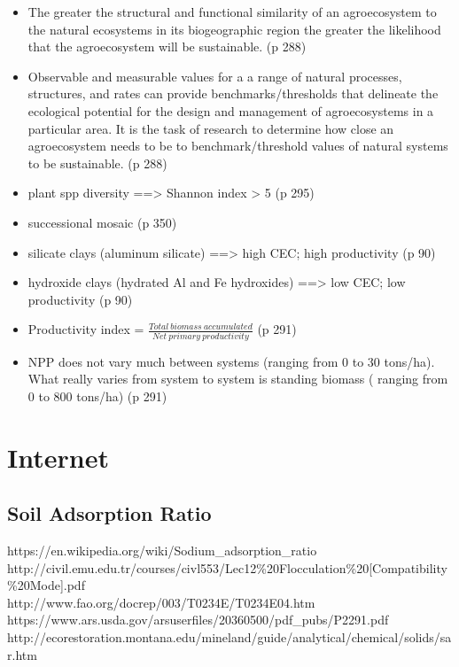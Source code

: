 \documentclass[twoside]{article}	%
\begin{document}
\begin{itemize}
  \item The greater the structural and functional similarity of an agroecosystem to the natural ecosystems in its biogeographic region the greater the likelihood that the agroecosystem will be sustainable. (p 288)
  \item Observable and measurable values for a a range of natural processes, structures, and rates can provide benchmarks/thresholds that delineate the ecological potential for the design and management of agroecosystems in a particular area. It is the task of research to determine how close an agroecosystem needs to be to benchmark/threshold values of natural systems to be sustainable. (p 288)
  \item plant spp diversity ==> Shannon index > 5 (p 295)
  \item successional mosaic (p 350)
  \item silicate clays (aluminum silicate) ==> high CEC; high productivity (p 90)
  \item hydroxide clays (hydrated Al and Fe hydroxides) ==> low CEC; low productivity (p 90)
  \item Productivity index = $ \frac{Total \ biomass \ accumulated}{Net \ primary \ productivity}$ (p 291)
  \item NPP does not vary much between systems (ranging from 0 to 30 tons/ha). What really varies from system to system is standing biomass ( ranging from 0 to 800 tons/ha) (p 291)
   
\end{itemize}




\section{Internet}

\subsection{Soil Adsorption Ratio}
https://en.wikipedia.org/wiki/Sodium\_adsorption\_ratio\\
http://civil.emu.edu.tr/courses/civl553/Lec12\%20Flocculation\%20[Compatibility\%20Mode].pdf\\
http://www.fao.org/docrep/003/T0234E/T0234E04.htm\\
https://www.ars.usda.gov/arsuserfiles/20360500/pdf\_pubs/P2291.pdf\\
http://ecorestoration.montana.edu/mineland/guide/analytical/chemical/solids/sar.htm
\end{document}
